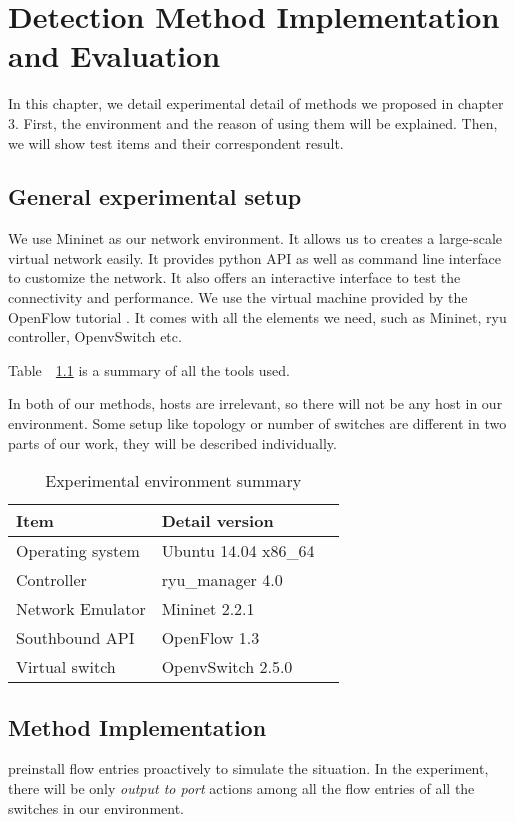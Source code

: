 \chapter{Detection Method Implementation and Evaluation}
In this chapter, we detail experimental detail of methods we proposed in chapter 3. First, the environment and the reason of using them will be explained. Then, we will show test items and their correspondent result.

\section{General experimental setup}
We use Mininet as our network environment. It allows us to creates a large-scale virtual network easily. 
It provides python API as well as command line interface to customize the network. It also offers an interactive interface to test the connectivity and performance. We use the virtual machine provided by the OpenFlow tutorial \cite{OFT}. It comes with all the elements we need, such as Mininet, ryu controller, OpenvSwitch etc.

Table~~\ref{table:Experiment_table} is a summary of all the tools used. 

In both of our methods, hosts are irrelevant, so there will not be any host in our environment. Some setup like topology or number of switches are different in two parts of our work, they will be described individually.

\begin{table}[H]
\centering
\caption{Experimental environment summary}
\begin{tabular}{|l|p{4cm}|p{4.5cm}}
\hline Item & Detail version \\
\hline Operating system & Ubuntu 14.04 x86\_64 \\
\hline Controller & ryu\_manager 4.0 \\
\hline Network Emulator & Mininet 2.2.1\\
\hline Southbound API & OpenFlow 1.3 \\
\hline Virtual switch & OpenvSwitch 2.5.0 \\
\hline 
\end{tabular}
\label{table:Experiment_table}
\end{table}

\section{Method Implementation}
preinstall flow entries proactively to simulate the situation. 
In the experiment, there will be only \textit{output to port} actions among all the flow entries of all the switches in our environment. 
